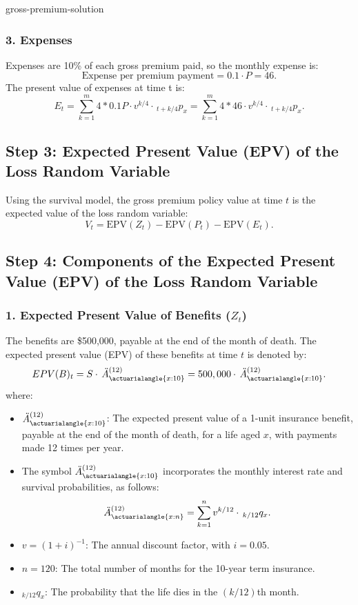 \begin{solve}{}{gross-premium-solution}
		\subsubsection*{3. Expenses}
		Expenses are 10\% of each gross premium paid, so the monthly expense is:
		\[
		\text{Expense per premium payment} = 0.1 \cdot P = 46.
		\]
		The present value of expenses at time t is:
		\[
		E_t = \sum_{k=1}^{m} 4 * 0.1P \cdot v^{k/4} \cdot \,_{t+k/4}p_{x} = \sum_{k=1}^{m} 4 * 46 \cdot v^{k/4} \cdot \,_{t+k/4}p_{x}. 
		\]
		
		\subsection*{Step 3: Expected Present Value (EPV) of the Loss Random Variable}
		Using the survival model, the gross premium policy value at time $t$ is the expected value of the loss random variable:
		\[
		V_t = \text{EPV}(Z_t) - \text{EPV}(P_t) - \text{EPV}(E_t).
		\]
		\subsection*{Step 4: Components of the Expected Present Value (EPV) of the Loss Random Variable}
		\subsubsection*{1. Expected Present Value of Benefits (\(Z_t\))}
		
		The benefits are \$500,000, payable at the end of the month of death. The expected present value (EPV) of these benefits at time \(t\) is denoted by:
		\[
		EPV(B)_t = S \cdot \,  \ddot{A}_{\actuarialangle{x:10}}^{(12)} = 500,000 \cdot \,  \ddot{A}_{\actuarialangle{x:10}}^{(12)}.
		\]
		where:
		\begin{itemize}
			\item \(\ddot{A}_{\actuarialangle{x:10}}^{(12)}\): The expected present value of a 1-unit insurance benefit, payable at the end of the month of death, for a life aged \(x\), with payments made 12 times per year.
			\item The symbol \(\ddot{A}_{\actuarialangle{x:10}}^{(12)}\) incorporates the monthly interest rate and survival probabilities, as follows:
			\[
			\ddot{A}_{\actuarialangle{x:n}}^{(12)} = \sum_{k=1}^{n} v^{k/12} \cdot \, _{k/12}q_x.
			\]
			\item \(v = (1+i)^{-1}\): The annual discount factor, with \(i = 0.05\).
			\item \(n = 120\): The total number of months for the 10-year term insurance.
			\item \(_{k/12}q_x\): The probability that the life dies in the \((k/12)\)th month.
		\end{itemize}
		

\end{solve}
